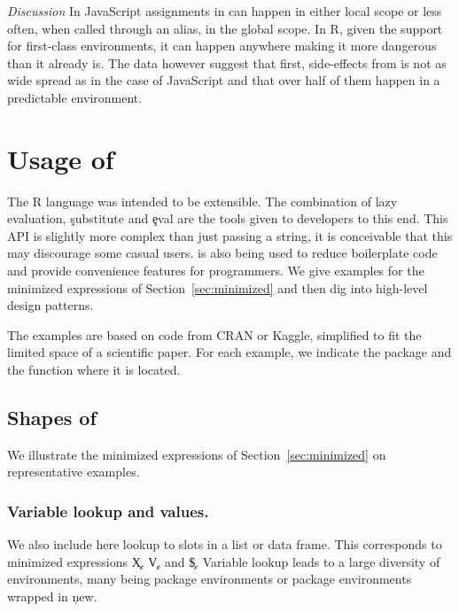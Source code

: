 \documentclass[review,screen,acmsmall,anonymous=true]{acmart}
\newcommand{\mypara}[1]{\medskip\noindent\emph{#1}\xspace}
\begin{document}
\mypara{Discussion} In JavaScript assignments in \eval can happen in either
local scope or less often, when called through an alias, in the global scope.
In R, given the support for first-class environments, it can happen anywhere
making it \eval more dangerous than it already is. The data however suggest
that first, side-effects from \eval is not as wide spread as in the case of
JavaScript and that over half of them happen in a predictable environment.

\section{Usage of \eval}




The R language was intended to be extensible. The combination of lazy
evaluation, \c{substitute} and \c{eval} are the tools given to
developers to this end. This API is slightly more complex than just
passing a string, it is conceivable that this may discourage some
casual users. \Eval is also being used to reduce boilerplate code and
provide convenience features for programmers. We give examples for the minimized expressions of Section~\ref{sec:minimized} and then dig into high-level \eval design patterns.

The examples are based on code from CRAN or Kaggle, simplified to fit the limited space of a scientific paper. For each example, we indicate the package and the function where it is located.

\subsection{Shapes of \eval}

We illustrate the minimized expressions of Section~\ref{sec:minimized} on representative examples. 


\subsubsection{Variable lookup and values.}  We also include here lookup to slots in a list or data frame.
This corresponds to minimized expressions \c{X}, \c{V}, and  \c{\$}. Variable lookup leads to a large diversity of environments, many being package environments or package environments wrapped in \c{new}.
\end{document}
